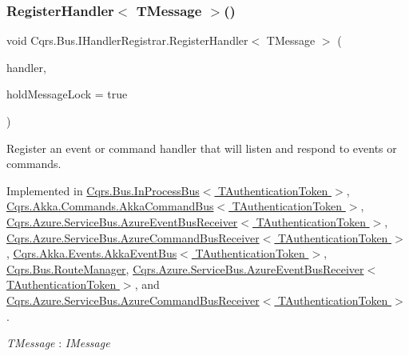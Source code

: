 \subsubsection{\texorpdfstring{Register\+Handler$<$ T\+Message $>$()}{RegisterHandler< TMessage >()}\hspace{0.1cm}{\footnotesize\ttfamily [2/2]}}
{\footnotesize\ttfamily void Cqrs.\+Bus.\+I\+Handler\+Registrar.\+Register\+Handler$<$ T\+Message $>$ (\begin{DoxyParamCaption}\item[{Action$<$ T\+Message $>$}]{handler,  }\item[{bool}]{hold\+Message\+Lock = {\ttfamily true} }\end{DoxyParamCaption})}



Register an event or command handler that will listen and respond to events or commands. 



Implemented in \hyperlink{classCqrs_1_1Bus_1_1InProcessBus_a62171e3c6d155cfdfd921b07b4909adf_a62171e3c6d155cfdfd921b07b4909adf}{Cqrs.\+Bus.\+In\+Process\+Bus$<$ T\+Authentication\+Token $>$}, \hyperlink{classCqrs_1_1Akka_1_1Commands_1_1AkkaCommandBus_adc21072d2b02c745747c4d585a53dba3_adc21072d2b02c745747c4d585a53dba3}{Cqrs.\+Akka.\+Commands.\+Akka\+Command\+Bus$<$ T\+Authentication\+Token $>$}, \hyperlink{classCqrs_1_1Azure_1_1ServiceBus_1_1AzureEventBusReceiver_a0c4ab01eece7025add9aa9ab4d23111d_a0c4ab01eece7025add9aa9ab4d23111d}{Cqrs.\+Azure.\+Service\+Bus.\+Azure\+Event\+Bus\+Receiver$<$ T\+Authentication\+Token $>$}, \hyperlink{classCqrs_1_1Azure_1_1ServiceBus_1_1AzureCommandBusReceiver_a1c9aba2692f51b66921802333433e2f7_a1c9aba2692f51b66921802333433e2f7}{Cqrs.\+Azure.\+Service\+Bus.\+Azure\+Command\+Bus\+Receiver$<$ T\+Authentication\+Token $>$}, \hyperlink{classCqrs_1_1Akka_1_1Events_1_1AkkaEventBus_a6795dfcaf611ce1b50310f442cef0546_a6795dfcaf611ce1b50310f442cef0546}{Cqrs.\+Akka.\+Events.\+Akka\+Event\+Bus$<$ T\+Authentication\+Token $>$}, \hyperlink{classCqrs_1_1Bus_1_1RouteManager_aeb620222dd0351a6d3848caf93e29954_aeb620222dd0351a6d3848caf93e29954}{Cqrs.\+Bus.\+Route\+Manager}, \hyperlink{classCqrs_1_1Azure_1_1ServiceBus_1_1AzureEventBusReceiver_a0c4ab01eece7025add9aa9ab4d23111d_a0c4ab01eece7025add9aa9ab4d23111d}{Cqrs.\+Azure.\+Service\+Bus.\+Azure\+Event\+Bus\+Receiver$<$ T\+Authentication\+Token $>$}, and \hyperlink{classCqrs_1_1Azure_1_1ServiceBus_1_1AzureCommandBusReceiver_a1c9aba2692f51b66921802333433e2f7_a1c9aba2692f51b66921802333433e2f7}{Cqrs.\+Azure.\+Service\+Bus.\+Azure\+Command\+Bus\+Receiver$<$ T\+Authentication\+Token $>$}.

\begin{Desc}
\item[Type Constraints]\begin{description}
\item[{\em T\+Message} : {\em I\+Message}]\end{description}
\end{Desc}
